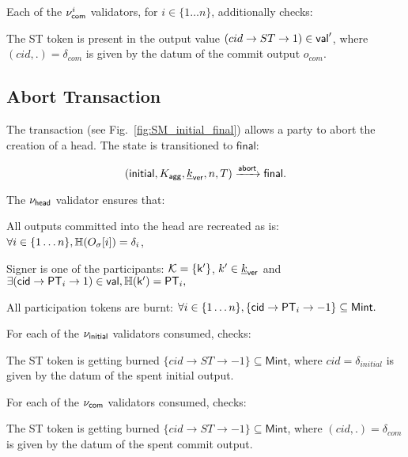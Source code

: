 \noindent Each of the $\nu_\mathsf{com}^i$ validators, for $i \in \{ 1\dots n\}$, additionally checks:
\begin{menumerate}
    \item The ST token is present in the output value $(cid \rightarrow ST \rightarrow 1) \in \mathsf{val}'$, where $(cid,.) = \delta_{com}$ is given by the datum of the commit output $o_{com}$.
\end{menumerate}

\subsection{Abort Transaction}\label{sec:abort-tx} 




The \mtxAbort{} transaction
(see Fig.~\ref{fig:SM_initial_final}) allows a party to abort the
creation of a head.  The state is transitioned to $\mathsf{final}$:

$$
   (\mathsf{initial},K_{\mathsf{agg}},\underline{k}_{\mathsf{ver}},n,T) \xrightarrow{\mathsf{abort}} \mathsf{final}.
$$

\noindent The $\nu_\mathsf{head}$ validator ensures that:
\begin{menumerate}
 \item All outputs committed into the head are recreated as is: $\forall i \in \{1\dots n\}, \mathbb{H}(O_\sigma[i]) = \delta_i$,
  \item Signer is one of the participants: $\mathcal K = \{\mathsf{k'}\}$, $k' \in \underline{k}_{\mathsf{ver}}$ and
    $
    \exists (\mathsf{cid} \rightarrow \mathsf{PT}_i \rightarrow 1) \in \mathsf{val}, \mathbb{H}(\mathsf{k'}) = \mathsf{PT}_i,
    $
 \item All participation tokens are burnt: $\forall i \in \{1\dots n\}, \{\mathsf{cid} \rightarrow \mathsf{PT}_i \rightarrow -1\} \subseteq \mathsf{Mint}.$
\end{menumerate} 

\noindent For each of the $\nu_\mathsf{initial}$ validators consumed, checks:
\begin{menumerate}
  \item The ST token is getting burned
  $\{cid \rightarrow ST \rightarrow -1\} \subseteq \mathsf{Mint}$, where
  $cid = \delta_{initial}$ is given by the datum of the spent initial output.
\end{menumerate}

\noindent For each of the $\nu_\mathsf{com}$ validators consumed, checks:
\begin{menumerate}
  \item The ST token is getting burned
  $\{cid \rightarrow ST \rightarrow -1\} \subseteq \mathsf{Mint}$, where
  $(cid,.) = \delta_{com}$ is given by the datum of the spent commit output.
\end{menumerate}

